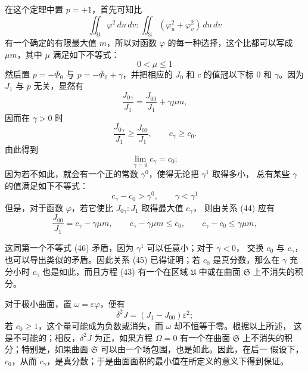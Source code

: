 \documentclass[11pt,a4paper,leqno]{article}
\begin{document}
在这个定理中置 $p=+1$，首先可知比
\[
\iint_{\mathfrak{U}}\varphi^2\,du\,dv:
\iint_{\mathfrak{U}}(\varphi_u^2+\varphi_v^2)\,du\,dv
\]
有一个确定的有限最大值 $m$，所以对函数 $\varphi$ 的每一种选择，这个比都可以写成
$\mu m$，其中 $\mu$ 满足如下不等式：
\[
0<\mu\leq 1
\]
然后置 $p=-\bar\Phi_0$ 与 $p=-\bar\Phi_0+\gamma$，并把相应的 $J_0$ 和
$c$ 的值冠以下标 0 和 $\gamma$。因为 $J_1$ 与 $p$ 无关，显然有
\begin{equation}\tag{44}
\frac{J_{0\gamma}}{J_1}=\frac{J_{00}}{J_1}+\gamma\mu m,
\end{equation}
因而在 $\gamma>0$ 时
\[
\frac{J_{0\gamma}}{J_1}\geq\frac{J_{00}}{J_1},\qquad
c_\gamma\geq c_0.
\]
由此得到
\begin{equation}\tag{45}
\lim_{\gamma=0}c_\gamma=c_0;
\end{equation}
因为若不如此，就会有一个正的常数 $\gamma^0$，使得无论把 $\gamma^1$ 取得多小，
总有某些 $\gamma$ 的值满足如下不等式：
\begin{equation}\tag{46}
c_\gamma-c_0>\gamma^0,\qquad \gamma<\gamma^1
\end{equation}
但是，对于函数 $\varphi$，若它使比 $J_{0\gamma}:J_1$ 取得最大值 $c_\gamma$，
则由关系 (44) 应有
\[
\frac{J_{00}}{J_1}=c_\gamma-\gamma\mu m,\qquad
c_\gamma-\gamma\mu m\leq c_0,\qquad
c_\gamma-c_0\leq\gamma\mu m,
\]

这同第一个不等式 (46) 矛盾，因为 $\gamma^1$ 可以任意小；对于 $\gamma<0$，
交换 $c_0$ 与 $c_\gamma$，也可以导出类似的矛盾。因此关系 (45) 已得证明；若
$c_0$ 是真分数，那么在 $\gamma$ 充分小时 $c_\gamma$ 也是如此，而且方程 (43)
有一个在区域 $\mathfrak{U}$ 中或在曲面 $\mathfrak{S}$ 上不消失的积分。

对于极小曲面，置 $\omega=\varepsilon\varphi$，便有
\[
\delta^2J=(J_1-J_{00})\varepsilon^2;
\]
若 $c_0\geq 1$，这个量可能成为负数或消失，而 $\omega$ 却不恒等于零。根据以上所述，
这是不可能的；相反，$\delta^2J$ 为正，如果方程 $\Omega=0$ 有一个在曲面
$\mathfrak{S}$ 上不消失的积分；特别是，如果曲面 $\mathfrak{S}$ 可以由一个场包围，也是如此。因此，在后一
假设下，$c_0$，从而 $c_\gamma$，是真分数；于是曲面面积的最小值在所定义的意义下得到保证。
\end{document}
